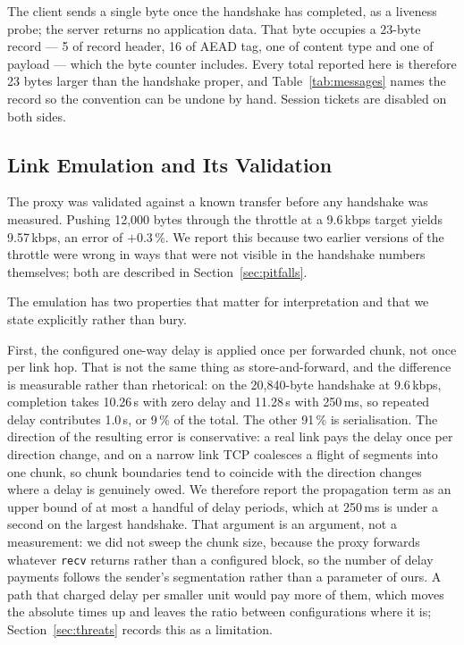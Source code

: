 \documentclass[drones,article,submit,pdftex,moreauthors]{Definitions/mdpi}
\newcommand{\kbps}{kbps}
\begin{document}
The client sends a single byte once the handshake has completed, as a
liveness probe; the server returns no application data. That byte
occupies a 23-byte record --- 5 of record header, 16 of AEAD tag, one of
content type and one of payload --- which the byte counter includes. Every
total reported here is therefore 23 bytes larger than the handshake
proper, and Table~\ref{tab:messages} names the record so the convention can
be undone by hand. Session tickets are disabled on both sides.

\subsection{Link Emulation and Its Validation}
\label{sec:link}

The proxy was validated against a known transfer before any handshake
was measured. Pushing 12{,}000 bytes through the throttle at a
9.6\,\kbps{} target yields 9.57\,\kbps{}, an error of $+0.3$\,\%. We
report this because two earlier versions of the throttle were wrong in
ways that were not visible in the handshake numbers themselves; both are
described in Section~\ref{sec:pitfalls}.

The emulation has two properties that matter for interpretation and that
we state explicitly rather than bury.

First, the configured one-way delay is applied once per forwarded
chunk, not once per link hop. That is not the same thing as
store-and-forward, and the difference is measurable rather than
rhetorical: on the 20{,}840-byte handshake at 9.6\,\kbps{}, completion
takes 10.26\,s with zero delay and 11.28\,s with 250\,ms, so repeated
delay contributes 1.0\,s, or 9\,\% of the total. The other 91\,\% is
serialisation. The direction of the resulting error is conservative: a
real link pays the delay once per direction change, and on a narrow link
TCP coalesces a flight of segments into one chunk, so chunk boundaries
tend to coincide with the direction changes where a delay is genuinely
owed. We therefore report the propagation term as an upper bound of at
most a handful of delay periods, which at 250\,ms is under a second on
the largest handshake. That argument is an argument, not a measurement:
we did not sweep the chunk size, because the proxy forwards whatever
\texttt{recv} returns rather than a configured block, so the number of
delay payments follows the sender's segmentation rather than a parameter
of ours. A path that charged delay per smaller unit would pay more of
them, which moves the absolute times up and leaves the ratio between
configurations where it is; Section~\ref{sec:threats} records this as a
limitation.
\end{document}
